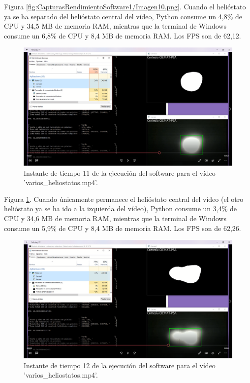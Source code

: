 Figura \ref{fig:CapturasRendimientoSoftware1/Imagen10.png}. Cuando el helióstato ya se ha separado del helióstato central del vídeo, Python consume un 4,8\% de CPU y 34,5 MB de memoria RAM, mientras que la terminal de Windows consume un 6,8\% de CPU y 8,4 MB de memoria RAM. Los FPS son de 62,12.\\[20pt]

\begin{figure}[h!]
  	\centering
	\includegraphics[width=\textwidth]{CapturasRendimientoSoftware1/Imagen11.png}
	\caption{Instante de tiempo 11 de la ejecución del software para el vídeo 'varios\_heliostatos.mp4'.
	\label{fig:CapturasRendimientoSoftware1/Imagen11.png}}
\end{figure}

Figura \ref{fig:CapturasRendimientoSoftware1/Imagen11.png}. Cuando únicamente permanece el helióstato central del vídeo (el otro helióstato ya se ha ido a la izquierda del vídeo), Python consume un 3,4\% de CPU y 34,6 MB de memoria RAM, mientras que la terminal de Windows consume un 5,9\% de CPU y 8,4 MB de memoria RAM. Los FPS son de 62,26.\\[20pt]

\begin{figure}[h!]
  	\centering
	\includegraphics[width=\textwidth]{CapturasRendimientoSoftware1/Imagen12.png}
	\caption{Instante de tiempo 12 de la ejecución del software para el vídeo 'varios\_heliostatos.mp4'.
	\label{fig:CapturasRendimientoSoftware1/Imagen12.png}}
\end{figure}


